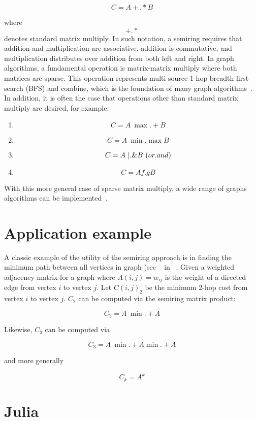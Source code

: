 \documentclass[conference]{IEEEtran}
\begin{document}
$$C = A +.* B$$

where $$+.*$$ denotes standard matrix multiply.  In such notation, a
semiring requires that addition and multiplication are associative,
addition is commutative, and multiplication distributes over addition
from both left and right.  In graph algorithms, a fundamental
operation is matrix-matrix multiply where both matrices are sparse.
This operation represents multi source 1-hop breadth first search
(BFS) and combine, which is the foundation of many graph
algorithms~\cite{shahgilbert}.  In addition, it is often the case that
operations other than standard matrix multiply are desired, for
example:

\begin{enumerate}
\item $$C = A \ {\max.+} B$$
\item $$C = A \ \min.\max B$$
\item $$C = A \ |.\& B \ ({\mbox or.and})$$
\item $$C = A f.g B $$
\end{enumerate}

With this more general case of sparse matrix multiply, a wide range of graphs algorithms can be implemented~\cite{KepnerGilbertBook}.

\section{Application example}

A classic example of the utility of the semiring approach is in
finding the minimum path between all vertices in graph (see
~\cite{Rader} in ~\cite{KepnerGilbertBook}.  Given a weighted
adjacency matrix for a graph where $A(i,j) = w_{ij}$ is the weight of
a directed edge from vertex $i$ to vertex $j$.  Let $C(i,j)_2$ be the
minimum 2-hop cost from vertex $i$ to vertex $j$.
$C_2$ can be computed via the semiring matrix product:

$$C_2 = A \ \min.+ A$$

Likewise, $C_3$ can be computed via

$$C_3 = A\  \min.+ A \min.+ A$$

and more generally

$$C_k = A^k$$

\section{Julia}
\end{document}
